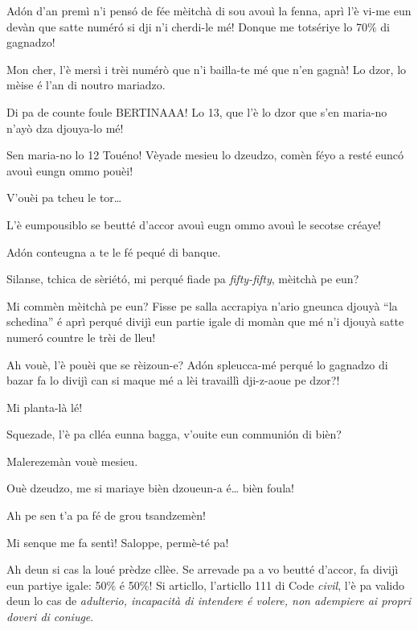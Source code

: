\begin{drama}
\Tobiespeaks Adón d’an premì n’i pensó de fée mèitchà di sou avouì la fenna, aprì l’è vi-me eun devàn que satte numér\'o si dji n’i cherdi-le mé! Donque me totsériye lo 70$\%$ di gagnadzo!

\Bertinaspeaks Mon cher, l’è mersì i trèi numérò que n’i bailla-te mé que n’en gagnà! Lo dzor, lo mèise é l’an di noutro mariadzo.

\Tobiespeaks Di pa de counte foule BERTINAAA! Lo 13, que l’è lo dzor que s’en maria-no n’ayò dza djouya-lo mé!

\Bertinaspeaks Sen maria-no lo 12 Touéno!  Vèyade mesieu lo dzeudzo, comèn féyo a resté eunc\'o avouì eungn ommo pouèi!

\DzeudzoSenliquerspeaks V'ouèi pa tcheu le tor\ldots

\Bertinaspeaks L’è eumpousiblo se beutté d’accor avouì eugn ommo avouì le secotse créaye!

\Tobiespeaks Adón conteugna a te le fé pequé di banque.

\DzeudzoSenliquerspeaks {} Silanse, tchica de sèriét\'o, mi perqué fiade pa \textit{fifty-fifty}, mèitchà pe eun?

\Tobiespeaks Mi commèn mèitchà pe eun? Fisse pe salla accrapiya n’ario gneunca djouyà ``la schedina'' é aprì perqué divijì eun partie igale di momàn que mé n'i djouyà satte numer\'o countre le trèi de lleu!

\Bertinaspeaks Ah vouè, l’è pouèi que se rèizoun-e? Ad\'on spleucca-mé perqué lo gagnadzo di bazar fa lo divijì can si maque mé a lèi travaillì dji-z-aoue pe dzor?!

\Tobiespeaks Mi planta-là lé!

\DzeudzoSenliquerspeaks {} Squezade, l’è pa cllé\-a eunna bagga, v'ouite eun communión di bièn?

\Tobiespeaks Malerezemàn vouè mesieu.

\Bertinaspeaks Ouè dzeudzo, me si mariaye bièn dzoueun-a é\ldots {} bièn foula!

\Tobiespeaks Ah pe sen t’a pa fé de grou tsandzemèn!

\Bertinaspeaks Mi senque me fa sentì! Saloppe, permè-té pa!

\DzeudzoSenliquerspeaks {} Ah deun si cas la loué prèdze cllèe. Se arrevade pa a vo beutté d’accor, fa divijì eun partiye igale: 50$\%$ é 50$\%$! Si articllo, l’articllo 111 di Code \textit{civil}, l’è pa valido deun lo cas de  \og \textit{adulterio, incapacità di intendere é volere, non adempiere ai propri doveri di coniuge}\fg .


\end{drama}
